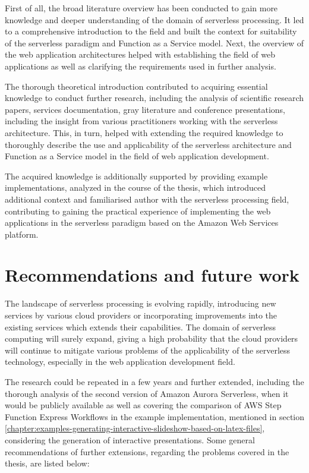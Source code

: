 First of all, the broad literature overview has been conducted to gain more knowledge and deeper understanding of the domain of serverless processing.
It led to a comprehensive introduction to the field and built the context for suitability of the serverless paradigm and Function as a Service model.
Next, the overview of the web application architectures helped with establishing the field of web applications as well as clarifying the requirements used in further analysis.

The thorough theoretical introduction contributed to acquiring essential knowledge to conduct further research, including the analysis of scientific research papers, services documentation, gray literature and conference presentations, including the insight from various practitioners working with the serverless architecture.
This, in turn, helped with extending the required knowledge to thoroughly describe the use and applicability of the serverless architecture and Function as a Service model in the field of web application development.

The acquired knowledge is additionally supported by providing example implementations, analyzed in the course of the thesis, which introduced additional context and familiarised author with the serverless processing field, contributing to gaining the practical experience of implementing the web applications in the serverless paradigm based on the Amazon Web Services platform.

\section{Recommendations and future work}

The landscape of serverless processing is evolving rapidly, introducing new services by various cloud providers or incorporating improvements into the existing services which extends their capabilities.
The domain of serverless computing will surely expand, giving a high probability that the cloud providers will continue to mitigate various problems of the applicability of the serverless technology, especially in the web application development field.

The research could be repeated in a few years and further extended, including the thorough analysis of the second version of Amazon Aurora Serverless, when it would be publicly available as well as covering the comparison of AWS Step Function Express Workflows in the example implementation, mentioned in section \ref{chapter:examples-generating-interactive-slideshow-based-on-latex-files}, considering the generation of interactive presentations.
Some general recommendations of further extensions, regarding the problems covered in the thesis, are listed below:

